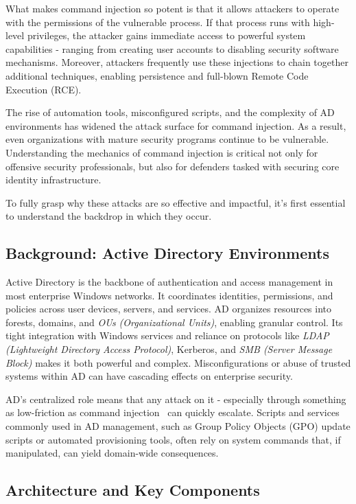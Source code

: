 What makes command injection so potent is that it allows attackers to operate with the permissions of the vulnerable process. If that process runs with high-level privileges, the attacker gains immediate access to powerful system capabilities - ranging from creating user accounts to disabling security software mechanisms. Moreover, attackers frequently use these injections to chain together additional techniques, enabling persistence and full-blown Remote Code Execution (RCE).

The rise of automation tools, misconfigured scripts, and the complexity of AD environments has widened the attack surface for command injection. As a result, even organizations with mature security programs continue to be vulnerable. Understanding the mechanics of command injection is critical not only for offensive security professionals, but also for defenders tasked with securing core identity infrastructure.

To fully grasp why these attacks are so effective and impactful, it’s first essential to understand the backdrop in which they occur.

\subsection{Background: Active Directory Environments}

Active Directory is the backbone of authentication and access management in most enterprise Windows networks. It coordinates identities, permissions, and policies across user devices, servers, and services. AD organizes resources into forests, domains, and \textit{OUs (Organizational Units)}, enabling granular control. Its tight integration with Windows services and reliance on protocols like \textit{LDAP (Lightweight Directory Access Protocol)}, Kerberos, and \textit{SMB (Server Message Block)} makes it both powerful and complex. Misconfigurations or abuse of trusted systems within AD can have cascading effects on enterprise security.

AD’s centralized role means that any attack on it - especially through something as low-friction as command injection  can quickly escalate. Scripts and services commonly used in AD management, such as Group Policy Objects (GPO) update scripts or automated provisioning tools, often rely on system commands that, if manipulated, can yield domain-wide consequences.

\subsection{Architecture and Key Components}

